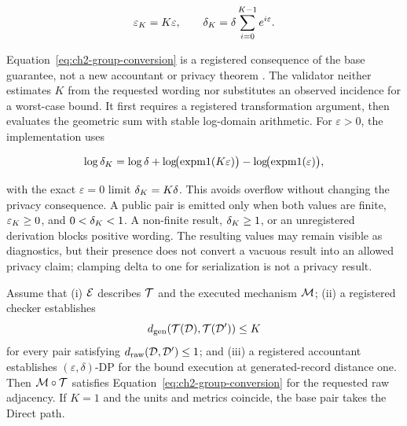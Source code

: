 \begin{equation}
    \varepsilon_{K} = K\varepsilon,
    \qquad
    \delta_{K}
    = \delta \sum_{i=0}^{K-1} e^{i\varepsilon}.
    \label{eq:ch2-group-conversion}
\end{equation}

Equation~\eqref{eq:ch2-group-conversion} is a registered consequence of the base
guarantee, not a new accountant or privacy theorem
\cite{dwork2014algorithmic}.  The validator neither estimates \(K\) from the
requested wording nor substitutes an observed incidence for a worst-case bound.
It first requires a registered transformation argument, then evaluates the
geometric sum with stable log-domain arithmetic.  For \(\varepsilon>0\), the
implementation uses

\begin{equation}
    \log \delta_{K}
    = \log\delta
    + \log\!\bigl(\operatorname{expm1}(K\varepsilon)\bigr)
    - \log\!\bigl(\operatorname{expm1}(\varepsilon)\bigr),
    \label{eq:ch2-stable-delta}
\end{equation}

with the exact \(\varepsilon=0\) limit \(\delta_{K}=K\delta\).  This avoids
overflow without changing the privacy consequence.  A public pair is emitted only
when both values are finite, \(\varepsilon_{K}\geq0\), and
\(0<\delta_{K}<1\).  A non-finite result,
\(\delta_{K}\geq1\), or an unregistered derivation blocks positive wording.
The resulting values may remain visible as diagnostics, but their presence does
not convert a vacuous result into an allowed privacy claim; clamping delta to one
for serialization is not a privacy result.

\begin{proposition}
\label{prop:ch2-contract-relative-consequence}
Assume that (i) \(\mathcal{E}\) describes \(\mathcal{T}\) and the executed
mechanism \(\mathcal{M}\); (ii) a registered checker establishes
\[
    d_{\mathrm{gen}}\!\left(
        \mathcal{T}(\mathcal{D}),
        \mathcal{T}(\mathcal{D}')
    \right) \leq K
\]
for every pair satisfying
\(d_{\mathrm{raw}}(\mathcal{D},\mathcal{D}')\leq1\); and (iii) a registered
accountant establishes \((\varepsilon,\delta)\)-DP for the bound execution at
generated-record distance one.  Then \(\mathcal{M}\circ\mathcal{T}\) satisfies
Equation~\eqref{eq:ch2-group-conversion} for the requested raw adjacency.  If
\(K=1\) and the units and metrics coincide, the base pair takes the
\textsf{Direct} path.
\end{proposition}

